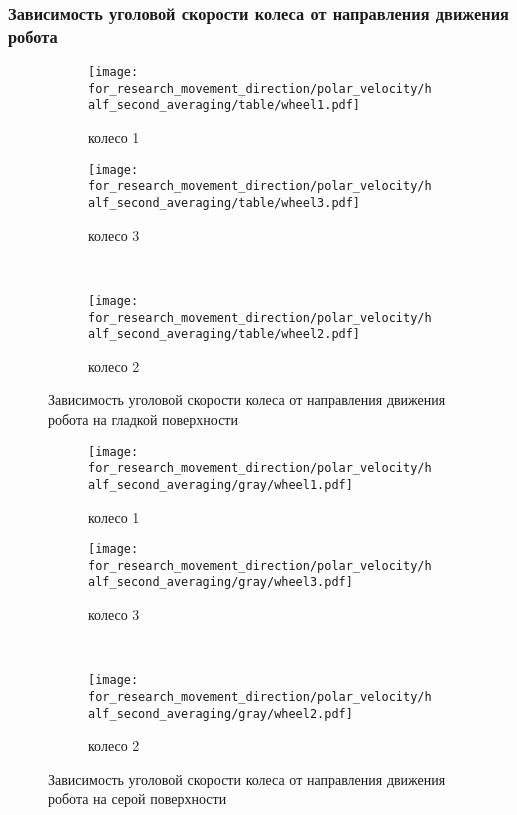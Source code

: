 \subsubsection{Зависимость уголовой скорости колеса от направления движения робота}

\begin{figure}[H]
    \centering
    \begin{subfigure}{0.45\textwidth}
        \centering
        \texttt{[image: for\_research\_movement\_direction/polar\_velocity/half\_second\_averaging/table/wheel1.pdf]}
        \caption{колесо 1}
    \end{subfigure}
    \hspace{0.005\textwidth}
    \begin{subfigure}{0.45\textwidth}
        \centering
        \texttt{[image: for\_research\_movement\_direction/polar\_velocity/half\_second\_averaging/table/wheel3.pdf]}
        \caption{колесо 3}
    \end{subfigure} \\
    \vspace{4pt}
    \centering
    \begin{subfigure}{0.45\textwidth}
        \centering
        \texttt{[image: for\_research\_movement\_direction/polar\_velocity/half\_second\_averaging/table/wheel2.pdf]}
        \caption{колесо 2}
    \end{subfigure}
    \caption{Зависимость уголовой скорости колеса от направления движения робота на гладкой поверхности}
\end{figure}

\begin{figure}[H]
    \centering
    \begin{subfigure}{0.49\textwidth}
        \centering
        \texttt{[image: for\_research\_movement\_direction/polar\_velocity/half\_second\_averaging/gray/wheel1.pdf]}
        \caption{колесо 1}
    \end{subfigure}
    \hspace{0.005\textwidth}
    \begin{subfigure}{0.49\textwidth}
        \centering
        \texttt{[image: for\_research\_movement\_direction/polar\_velocity/half\_second\_averaging/gray/wheel3.pdf]}
        \caption{колесо 3}
    \end{subfigure} \\
    \vspace{4pt}
    \centering
    \begin{subfigure}{0.49\textwidth}
        \centering
        \texttt{[image: for\_research\_movement\_direction/polar\_velocity/half\_second\_averaging/gray/wheel2.pdf]}
        \caption{колесо 2}
    \end{subfigure}
    \caption{Зависимость уголовой скорости колеса от направления движения робота на серой поверхности}
\end{figure}

